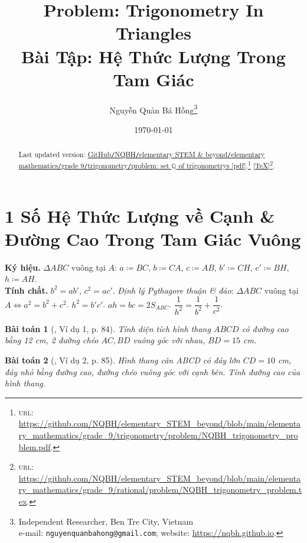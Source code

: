 \documentclass{article}
\title{Problem: Trigonometry In Triangles\\Bài Tập: Hệ Thức Lượng Trong Tam Giác}
\author{Nguyễn Quản Bá Hồng\footnote{Independent Researcher, Ben Tre City, Vietnam\\e-mail: \texttt{nguyenquanbahong@gmail.com}; website: \url{https://nqbh.github.io}.}}
\date{\today}
\newtheorem{baitoan}{Bài toán}
\begin{document}
\maketitle
\begin{abstract}
	Last updated version: \href{https://github.com/NQBH/elementary_STEM_beyond/blob/main/elementary_mathematics/grade_9/trigonometry/problem/NQBH_trigonometry_problem.pdf}{GitHub{\tt/}NQBH{\tt/}elementary STEM \& beyond{\tt/}elementary mathematics{\tt/}grade 9{\tt/}trigonometry{\tt/}problem: set $\mathbb{Q}$ of trigonometrys [pdf]}.\footnote{\textsc{url}: \url{https://github.com/NQBH/elementary_STEM_beyond/blob/main/elementary_mathematics/grade_9/trigonometry/problem/NQBH_trigonometry_problem.pdf}.} [\href{https://github.com/NQBH/elementary_STEM_beyond/blob/main/elementary_mathematics/grade_9/trigonometry/problem/NQBH_trigonometry_problem.tex}{\TeX}]\footnote{\textsc{url}: \url{https://github.com/NQBH/elementary_STEM_beyond/blob/main/elementary_mathematics/grade_9/rational/problem/NQBH_trigonometry_problem.tex}.}. 
\end{abstract}
\tableofcontents


\section{1 Số Hệ Thức Lượng về Cạnh \& Đường Cao Trong Tam Giác Vuông}
\textbf{\textsf{Ký hiệu.}} $\Delta ABC$ vuông tại $A$: $a\coloneqq BC$, $b\coloneqq CA$, $c\coloneqq AB$, $b'\coloneqq CH$, $c'\coloneqq BH$, $h\coloneqq AH$.\\\textbf{\textsf{Tính chất.}}  $b^2 = ab'$, $c^2 = ac'$.  \textit{Định lý Pythagore thuận \& đảo}: $\Delta ABC$ vuông tại $A\Leftrightarrow a^2 = b^2 + c^2$.  $h^2 = b'c'$.  $ah = bc = 2S_{ABC}$.  $\dfrac{1}{h^2} = \dfrac{1}{b^2} + \dfrac{1}{c^2}$.

\begin{baitoan}[\cite{Binh_Toan_9_tap_1}, Ví dụ 1, p. 84]
	Tính diện tích hình thang $ABCD$ có đường cao bằng {\rm12 cm}, 2 đường chéo $AC,BD$ vuông góc với nhau, $BD = 15$ {\rm cm}.
\end{baitoan}

\begin{baitoan}[\cite{Binh_Toan_9_tap_1}, Ví dụ 2, p. 85]
	Hình thang cân ABCD có đáy lớn $CD = 10$ {\rm cm}, đáy nhỏ bằng đường cao, đường chéo vuông góc với cạnh bên. Tính đường cao của hình thang.
\end{baitoan}
\end{document}
